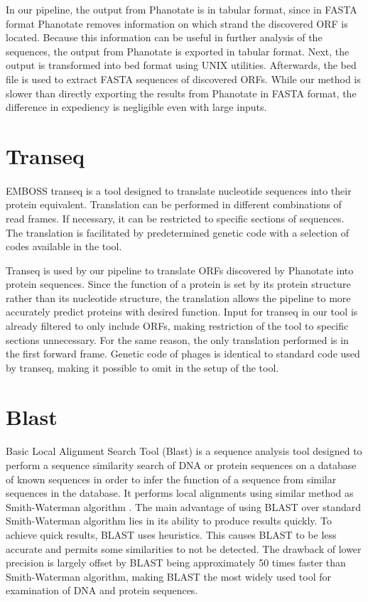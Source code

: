 In our pipeline, the output from Phanotate is in tabular format, since in FASTA format Phanotate removes information on which strand the discovered ORF is located. Because this information can be useful in further analysis of the sequences, the output from Phanotate is exported in tabular format. Next, the output is transformed into bed format using UNIX utilities. Afterwards, the bed file is used to extract FASTA sequences of discovered ORFs. While our method is slower than directly exporting the results from Phanotate in FASTA format, the difference in expediency is negligible even with large inputs.

\section{Transeq}
\paragraph*{}
EMBOSS transeq\cite{madeira2022search} is a tool designed to translate nucleotide sequences into their protein equivalent. Translation can be performed in different combinations of read frames. If necessary, it can be restricted to specific sections of sequences. The translation is facilitated by predetermined genetic code with a selection of codes available in the tool.

Transeq is used by our pipeline to translate ORFs discovered by Phanotate into protein sequences. Since the function of a protein is set by its protein structure rather than its nucleotide structure, the translation allows the pipeline to more accurately predict proteins with desired function. Input for transeq in our tool is already filtered to only include ORFs, making restriction of the tool to specific sections unnecessary. For the same reason, the only translation performed is in the first forward frame. Genetic code of phages is identical to standard code used by transeq, making it possible to omit in the setup of the tool.

\section{Blast}
\paragraph*{}
Basic Local Alignment Search Tool (Blast)\cite{altschul1990basic} is a sequence analysis tool designed to perform a sequence similarity search of DNA or protein sequences on a database of known sequences in order to infer the function of a sequence from similar sequences in the database. It performs local alignments using similar method as Smith-Waterman algorithm \cite{smith1981identification}. The main advantage of using BLAST over standard Smith-Waterman algorithm lies in its ability to produce results quickly. To achieve quick results, BLAST uses heuristics. This causes BLAST to be less accurate and permits some similarities to not be detected. The drawback of lower precision is largely offset by BLAST being approximately 50 times faster than Smith-Waterman algorithm, making BLAST the most widely used tool for examination of DNA and protein sequences.
